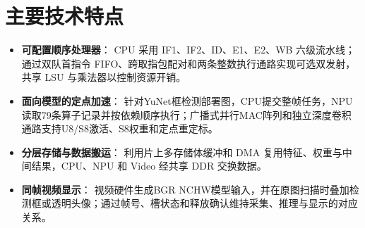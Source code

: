 \section{主要技术特点}

\begin{itemize}
    \item \textbf{可配置顺序处理器}： CPU 采用 IF1、IF2、ID、E1、E2、WB 六级流水线；通过双队首指令 FIFO、跨取指包配对和两条整数执行通路实现可选双发射，共享 LSU 与乘法器以控制资源开销。
    \item \textbf{面向模型的定点加速}： 针对YuNet框检测部署图，CPU提交整帧任务，NPU读取79条算子记录并按依赖顺序执行；广播式并行MAC阵列和独立深度卷积通路支持U8/S8激活、S8权重和定点重定标。
    \item \textbf{分层存储与数据搬运}： 利用片上多存储体缓冲和 DMA 复用特征、权重与中间结果，CPU、NPU 和 Video 经共享 DDR 交换数据。
    \item \textbf{同帧视频显示}： 视频硬件生成BGR NCHW模型输入，并在原图扫描时叠加检测框或透明头像；通过帧号、槽状态和释放确认维持采集、推理与显示的对应关系。
\end{itemize}
